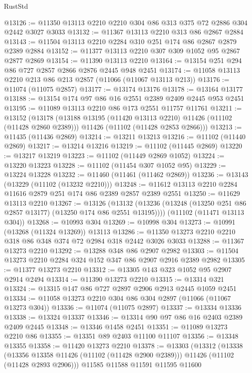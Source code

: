 \begin{lexlean}{RustStd}
\begin{coremodule}
@13126 := @11350 @13113 @2210 @2210 @304 @86 @313 @375 @72 @2886 @304 @2442 @3027 @3033
@13132 := @11367 @13113 @2210 @313 @86 @2867 @2884
@13143 := @11504 @13113 @2210 @2284 @310 @251 @174 @86 @2867 @2879 @2389 @2884
@13152 := @11377 @13113 @2210 @307 @309 @1052 @95 @2867 @2877 @2869
@13154 := @11390 @13113 @2210
@13164 := @13154 @251 @294 @86 @727 @2857 @2866 @2876 @2445 @948 @2451
@13174 := @11058 @13113 @2210 @213 @86 @213 @2857 (@11066 (@11067 @13113 @213))
@13176 := @11074 (@11075 @2857)
@13177 := @13174 @13176
@13178 := @13164 @13177
@13188 := @13154 @174 @97 @86 @16 @2551 @2389 @2409 @2445 @953 @2451
@13195 := @11089 @13113 @2210 @86 @173 @2551 @11757 @11761
@13211 := @13152
    (@13178
      (@13188 @13195 (@11420 @13113 @2210) @11426 (@11102 (@11428 @2860 @2389)))
      @11426
      (@11102 (@11428 @2853 @2866)))
@13213 := @11435 (@11436 @2869)
@13214 := @13211 @13213
@13216 := @11102 (@11440 @2869)
@13217 := @13214 @13216
@13219 := @11102 (@11445 @2869)
@13220 := @13217 @13219
@13223 := @11102 (@11449 @2869 @1052)
@13224 := @13220 @13223
@13228 := @11102 (@11454 @307 @1052 @95)
@13229 := @13224 @13228
@13232 := @11460 (@11461 (@11462 @2869))
@13236 := @13143 (@13229 (@11102 (@13232 @2210)))
@13248 := @11612 @13113 @2210 @2284 @11616 @2879 @251 @174 @86 @2389 @2857 @2389 @2551
@13250 := @11629 @13113 @2210
@13267 := @13126
    (@13132 (@13236 (@13248 (@13250 @251 @86 @2857 @13177) (@13250 @174 @86 @2551 @13195))))
    (@11102 (@11471 @13113 @304))
@13268 := @10993 @304
@13269 := @10998 @304
@13273 := @10991 (@13268 (@11324 @13269)) @13113
@13286 := @11350 @13273 @2210 @2210 @318 @86 @348 @374 @72 @2984 @318 @2442 @3026 @3033
@13288 := @11367 @13273 @2210
@13292 := @13288 @348 @86 @2907 @2982
@13303 := @11504 @13273 @2210 @2284 @324 @152 @347 @86 @2907 @2916 @2389 @2982
@13305 := @11377 @13273 @2210
@13312 := @13305 @143 @323 @1052 @95 @2907 @2914 @2494
@13314 := @11390 @13273 @2210
@13315 := @13314 @321
@13324 := @13315 @147 @86 @727 @2897 @2906 @2913 @2445 @1059 @2451
@13334 := @11058 @13273 @2210 @304 @86 @304 @2897 (@11066 (@11067 @13273 @304))
@13336 := @11074 (@11075 @2897)
@13337 := @13334 @13336
@13338 := @13324 @13337
@13346 := @13314 @90 @97 @86 @16 @2403 @2389 @2409 @2445
@13348 := @13346 @1458 @2451
@13351 := @11089 @13273 @2210 @86
@13355 := @13351 @89 @2403 @11100 @11107
@13356 := @13348 @13355
@13358 := @11420 @13273 @2210
@13378 := @13303
    (@13312
      (@13338
        (@13356 @13358 @11426 (@11102 (@11428 @2900 @2389)))
        @11426
        (@11102 (@11428 @2893 @2906)))
      @11585
      @11588
      @11591
      @11595
      @11600

\end{coremodule}
\end{lexlean}
